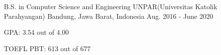 

\begin{cventries}

  \cventry
    {B.S. in Computer Science and Engineering} %
    {UNPAR(Universitas Katolik Parahyangan)} %
    {Bandung, Jawa Barat, Indonesia} %
    {Aug. 2016 - June 2020} %
    {
      \begin{cvitems} %
        \item {GPA: 3.54 out of 4.00}
        \item {TOEFL PBT: 613 out of 677}
      \end{cvitems}
    }

\end{cventries}
